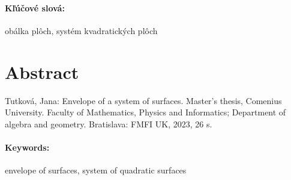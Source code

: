 \documentclass[12pt, twoside]{book}
\theoremstyle{definition}
\begin{document}
\paragraph*{Kľúčové slová:} obálka plôch, systém kvadratických plôch


\newpage 
\section*{Abstract}
Tutková, Jana: Envelope of a system of surfaces. Master's  thesis, Comenius University. Faculty of Mathematics, Physics and Informatics; Department of algebra and geometry. Bratislava: FMFI UK, 2023, 26 s.



\paragraph*{Keywords:} envelope of surfaces, system of quadratic surfaces


%
%



\newpage 

\tableofcontents



\newpage 

\listoffigures
\listoftables


\mainmatter


 




\end{document}
